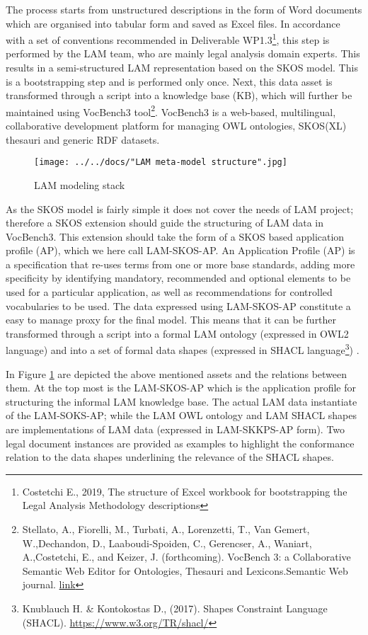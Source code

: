 The process starts from unstructured descriptions in the form of Word
documents which are organised into tabular form and saved as Excel
files. In accordance with a set of conventions recommended in Deliverable WP1.3\footnote{Costetchi E., 2019, The structure of Excel workbook for
	bootstrapping the Legal Analysis Methodology descriptions}, this step is performed by the LAM team, who are mainly legal analysis domain experts. 
This results in a semi-structured LAM representation based on the SKOS model. This is a bootstrapping step and is performed only once.
Next, this data asset is transformed through a script into a knowledge
base (KB), which will further be maintained using VocBench3
tool\footnote{Stellato, A., Fiorelli,
	M., Turbati, A., Lorenzetti, T., Van Gemert, W.,Dechandon, D., Laaboudi-Spoiden, C., Gerencser, A., Waniart, A.,Costetchi, E., and Keizer, J. (forthcoming). VocBench 3: a Collaborative Semantic Web Editor for Ontologies, Thesauri and Lexicons.Semantic Web journal. \href{http://www.semantic-web-journal.net/content/vocbench-3-collaborative-semantic-web-editor-ontologies-thesauri-and-lexicons-1}{link}}. VocBench3 is a
web-based, multilingual, collaborative development platform for managing
OWL ontologies, SKOS(XL) thesauri and generic RDF datasets.

\begin{figure}[!ht]
	\centering
	\texttt{[image: ../../docs/"LAM meta-model structure".jpg]}
	\caption{LAM modeling stack}
	\label{fig:meta-model}
\end{figure}

As the SKOS model is fairly simple it does not cover the needs of LAM
project; therefore a SKOS extension should guide the structuring of LAM
data in VocBench3. This extension should take the form of a SKOS based
application profile (AP), which we here call LAM-SKOS-AP. An Application
Profile (AP) is a specification that re-uses terms from one or more base
standards, adding more specificity by identifying mandatory, recommended
and optional elements to be used for a particular application, as well
as recommendations for controlled vocabularies to be used. The data
expressed using LAM-SKOS-AP constitute a easy to manage proxy for the
final model. This means that it can be further transformed through a
script into a formal LAM ontology (expressed in OWL2 language) and into
a set of formal data shapes (expressed in SHACL
language\footnote{Knublauch H. \& Kontokostas D., (2017). Shapes Constraint Language (SHACL). \url{https://www.w3.org/TR/shacl/}}) .

In Figure \ref{fig:meta-model} are depicted the above mentioned assets and the
relations between them. At the top most is the LAM-SKOS-AP which is the
application profile for structuring the informal LAM knowledge base. The
actual LAM data instantiate of the LAM-SOKS-AP; while the LAM OWL
ontology and LAM SHACL shapes are implementations of LAM data (expressed
in LAM-SKKPS-AP form). Two legal document instances are provided as
examples to highlight the conformance relation to the data shapes
underlining the relevance of the SHACL shapes.

